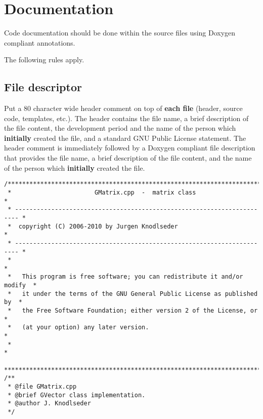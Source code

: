 \documentclass{article}[12pt,a4]
\begin{document}
\section{Documentation}

Code documentation should be done within the source files using Doxygen
compliant annotations.

The following rules apply.


\subsection{File descriptor}

Put a 80 character wide header comment on top of {\bf each file}
(header, source code, templates, etc.).
The header contains
the file name,
a brief description of the file content,
the development period and the name of the person which {\bf initially}
created the file, and
a standard GNU Public License statement.
The header comment is immediately followed by a Doxygen compliant
file description that provides
the file name,
a brief description of the file content, and
the name of the person which {\bf initially} created the file.
\begin{verbatim}
/***************************************************************************
 *                       GMatrix.cpp  -  matrix class                      *
 * ----------------------------------------------------------------------- *
 *  copyright (C) 2006-2010 by Jurgen Knodlseder                           *
 * ----------------------------------------------------------------------- *
 *                                                                         *
 *   This program is free software; you can redistribute it and/or modify  *
 *   it under the terms of the GNU General Public License as published by  *
 *   the Free Software Foundation; either version 2 of the License, or     *
 *   (at your option) any later version.                                   *
 *                                                                         *
 ***************************************************************************/
/**
 * @file GMatrix.cpp
 * @brief GVector class implementation.
 * @author J. Knodlseder
 */
\end{verbatim}


\end{document}
